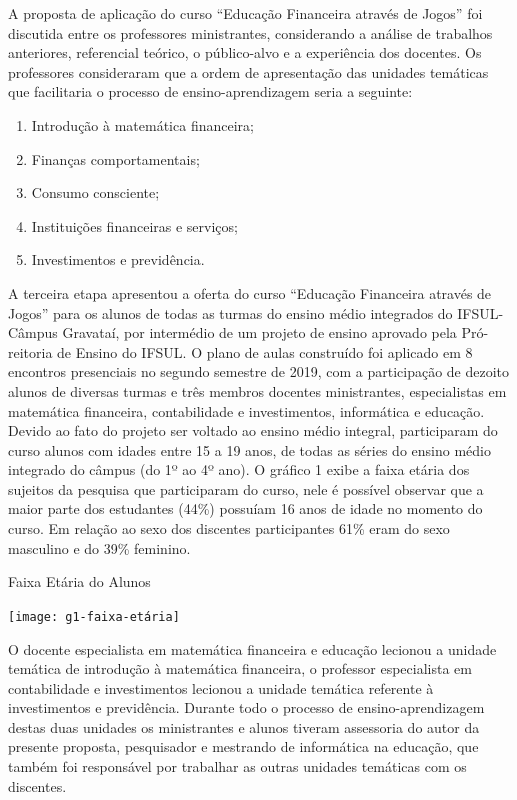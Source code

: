 A proposta de aplicação do curso “Educação Financeira através de Jogos” foi discutida entre os professores ministrantes, considerando a análise de trabalhos anteriores, referencial teórico, o público-alvo e a experiência dos docentes. Os professores consideraram que a ordem de apresentação das unidades temáticas que facilitaria o processo de ensino-aprendizagem seria a seguinte:

\begin{enumerate}
    \item Introdução à matemática financeira;
    \item Finanças comportamentais;
    \item Consumo consciente;
    \item Instituições financeiras e serviços;
    \item Investimentos e previdência. 
\end{enumerate}

A terceira etapa apresentou a oferta do curso “Educação Financeira através de Jogos” para os alunos de todas as turmas do ensino médio integrados do IFSUL-Câmpus Gravataí, por intermédio de um projeto de ensino aprovado pela Pró-reitoria de Ensino do IFSUL. O plano de aulas construído foi aplicado em 8 encontros presenciais no segundo semestre de 2019, com a participação de dezoito alunos de diversas turmas e três membros docentes ministrantes, especialistas em matemática financeira, contabilidade e investimentos, informática e educação. Devido ao fato do projeto ser voltado ao ensino médio integral, participaram do curso alunos com idades entre 15 a 19 anos, de todas as séries do ensino médio integrado do câmpus (do 1º ao 4º ano). O gráfico 1 exibe a faixa etária dos sujeitos da pesquisa que participaram do curso, nele é possível observar que a maior parte dos estudantes (44\%) possuíam 16 anos de idade no momento do curso. Em relação ao sexo dos discentes participantes 61\% eram do sexo masculino e do 39\% feminino.

\graphicspath{{graficos/}} 
\begin{grafico}[!ht]
\centering
\begin{minipage}{0.7\textwidth}
\caption{Faixa Etária do Alunos}
\centering
\texttt{[image: g1-faixa-etária]}
\label{graf: g1-faixa-etária}
\end{minipage}
\end{grafico}

O docente especialista em matemática financeira e educação lecionou a unidade temática de introdução à matemática financeira, o professor especialista em contabilidade e investimentos lecionou a unidade temática referente à investimentos e previdência. Durante todo o processo de ensino-aprendizagem destas duas unidades os ministrantes e alunos tiveram assessoria do autor da presente proposta, pesquisador e mestrando de informática na educação, que também foi responsável por trabalhar as outras unidades temáticas com os discentes.

